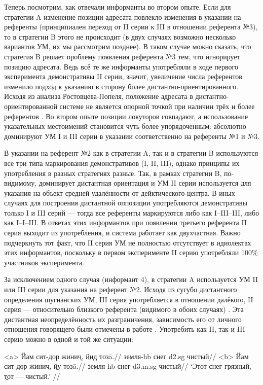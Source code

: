 Теперь посмотрим, как отвечали информанты во втором опыте. Если для стратегии A изменение позиции адресата повлекло изменения в указании на референты (принципиален переход от II серии к III в отношении референта №3), то в стратегии B этого не происходит (в двух случаях возможно несколько вариантов УМ, их мы рассмотрим позднее). В таком случае можно сказать, что стратегия B решает проблему появления референта №3 тем, что игнорирует позицию адресата. Ведь всё те же информанты употребляли в ходе первого эксперимента демонстративы II серии, значит, увеличение числа референтов изменило подход к указанию в сторону более дистантно-ориентированного. Исходя из анализа Ростовцева-Попеля, положение адресата в дистантно-ориентированной системе не является опорной точкой при наличии трёх и более референтов \parencite[29]{popiel2009}. Во втором опыте позиции локуторов совпадают, а использование указательных местоимений становится чуть более упорядоченным: абсолютно доминируют УМ I и III серии в указании соответственно на референты №1 и №3.

В указании на референт №2 как в стратегии A, так и в стратегии B используются все три типа маркирования демонстративов (I, II, III), однако принципы их употребления в разных стратегиях разные. Так, в рамках стратегии B, по-видимому, доминирует дистантная ориентация и УМ II серии используется для указания на объект средней удалённости от дейктического центра. В иных случаях для построения дистантной оппозиции употребляются демонстративы только I и III серий — тогда все референты маркируются либо как I–III–III, либо как I–I–III. В ответах этих информантов при появлении третьего референта II серия выходит из употребления, и система работает как двухчастная. Важно подчеркнуть тот факт, что II серия УМ не полностью отсутствует в идиолектах этих информантов, поскольку в первом эксперименте II серию употребляли 100\% участников эксперимента.

За исключением одного случая (информант 4), в стратегии A используется УМ II или III серии для указания на референт №2. Исходя из сугубо дистантного определения шугнанских УМ, III серия употребляется в отношении далёкого, II серия — относительно близкого референта (видимого в обоих случаях) \parencite[40]{yusufbekov1998}. Эта дистантная неопределённость их разграничения, зависимость его от личного отношения говорящего были отмечены в работе \parencite{belikov1972}. Употребить как II, так и III серию можно в одной и той же ситуации:

\a<a> \begingl
\gla Йам сит-дор жиниҷ, \b{йид} тозā.//
 земля-{\sc hb} снег {\sc d2.sg} чистый//
\endgl
\a<b> \begingl
\gla Йам сит-дор жиниҷ, \b{йу} тозā.//
 земля-{\sc hb} снег {\sc d3.m.sg} чистый//
\glft ‘Этот снег грязный, \b{тот} — чистый.’ //
\endgl \xe

